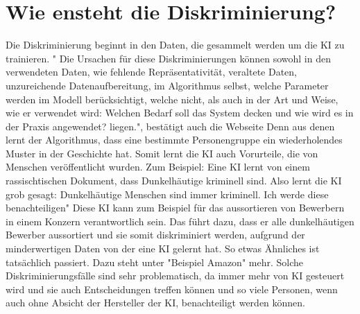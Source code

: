 \documentclass{article}
\begin{document}
\section{Wie ensteht die Diskriminierung?}
Die Diskriminierung beginnt in den Daten, die gesammelt werden um die KI zu trainieren. " Die Ursachen für diese Diskriminierungen können sowohl in den verwendeten Daten, wie fehlende Repräsentativität, veraltete Daten, unzureichende Datenaufbereitung, im Algorithmus selbst, welche Parameter werden im Modell berücksichtigt, welche nicht, als auch in der Art und Weise, wie er verwendet wird: Welchen Bedarf soll das System decken und wie wird es in der Praxis angewendet? liegen.", bestätigt auch die Webseite \citep{DiskriminierendeAlgorithmen}  Denn aus denen lernt der Algorithmus, dass eine bestimmte Personengruppe ein wiederholendes Muster in der Geschichte hat. Somit lernt die KI auch Vorurteile, die von Menschen veröffentlicht wurden. Zum Beispiel: Eine KI lernt von einem rassischtischen Dokument, dass Dunkelhäutige kriminell sind. Also lernt die KI grob gesagt: Dunkelhäutige Menschen sind immer kriminell. Ich werde diese benachteiligen" Diese KI kann zum Beispiel für das aussortieren von Bewerbern in einem Konzern verantwortlich sein. Das führt dazu, dass er alle dunkelhäutigen Bewerber aussortiert und sie somit diskriminiert werden, aufgrund der minderwertigen Daten von der eine KI gelernt hat. So etwas Ähnliches ist tatsächlich passiert. Dazu steht unter "Beispiel Amazon" mehr. Solche Diskriminierungsfälle sind sehr problematisch, da immer mehr von KI gesteuert wird und sie auch Entscheidungen treffen können und so viele Personen, wenn auch ohne Absicht der Hersteller der KI, benachteiligt werden können. 
\end{document}
